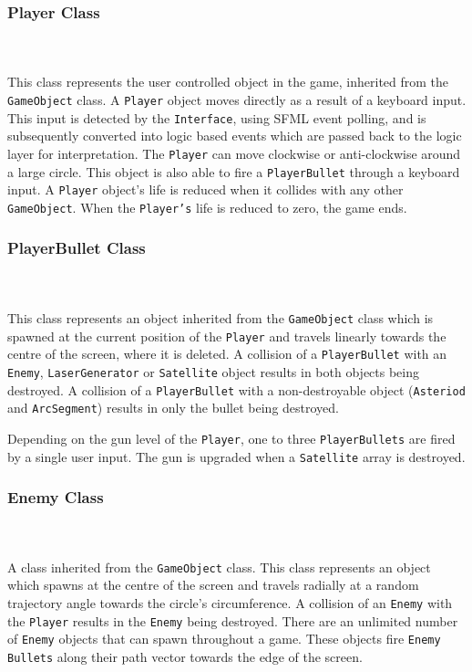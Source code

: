 \documentclass[10pt,twocolumn]{witseiepaper}
\begin{document}
\subsubsection{Player Class}
~\\
~\\
This class represents the user controlled object in the game, inherited from the \texttt{GameObject} class. A \texttt{Player} object moves directly as a result of a keyboard input. This input is detected by the \texttt{Interface}, using SFML event polling, and is  subsequently converted into logic based events which are passed back to the logic layer for interpretation. The \texttt{Player} can move clockwise or anti-clockwise around a large circle. This object is also able to fire a \texttt{PlayerBullet} through a keyboard input. A \texttt{Player} object's life is reduced when it collides with any other \texttt{GameObject}. When the \texttt{Player's} life is reduced to zero, the game ends.

\subsubsection{PlayerBullet Class}
~\\
~\\
This class represents an object inherited from the \texttt{GameObject} class which is spawned at the current position of the \texttt{Player} and travels linearly towards the centre of the screen, where it is deleted. A collision of a \texttt{PlayerBullet} with an \texttt{Enemy}, \texttt{LaserGenerator} or \texttt{Satellite} object results in both objects being destroyed. A collision of a \texttt{PlayerBullet} with a non-destroyable object (\texttt{Asteriod} and \texttt{ArcSegment}) results in only the bullet being destroyed.

Depending on the gun level of the \texttt{Player}, one to three \texttt{PlayerBullets} are fired by a single user input. The gun is upgraded when a \texttt{Satellite} array is destroyed. 

\subsubsection{Enemy Class}
~\\
~\\
A class inherited from the \texttt{GameObject} class. This class represents an object which spawns at the centre of the screen and travels radially at a random trajectory angle towards the circle's circumference. A collision of an \texttt{Enemy} with the \texttt{Player} results in the \texttt{Enemy} being destroyed. There are an unlimited number of \texttt{Enemy} objects that can spawn throughout a game. These objects fire \texttt{Enemy Bullets} along their path vector towards the edge of the screen.
\end{document}
